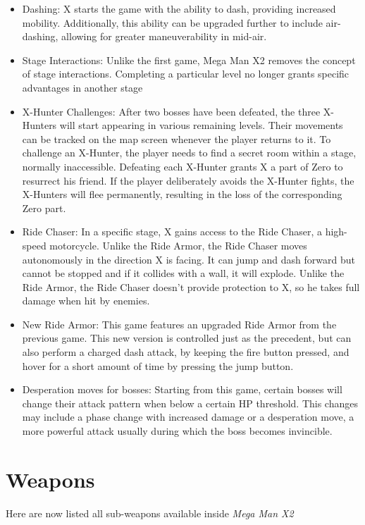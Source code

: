 \begin{itemize}
	\item Dashing: X starts the game with the ability to dash, providing increased mobility. Additionally, this ability can be upgraded further to include air-dashing, allowing for greater maneuverability in mid-air.
	\item Stage Interactions: Unlike the first game, Mega Man X2 removes the concept of stage interactions. Completing a particular level no longer grants specific advantages in another stage
	\item X-Hunter Challenges: After two bosses have been defeated, the three X-Hunters will start appearing in various remaining levels. Their movements can be tracked on the map screen whenever the player returns to it. To challenge an X-Hunter, the player needs to find a secret room within a stage, normally inaccessible. Defeating each X-Hunter grants X a part of Zero to resurrect his friend. If the player deliberately avoids the X-Hunter fights, the X-Hunters will flee permanently, resulting in the loss of the corresponding Zero part. 
	\item Ride Chaser: In a specific stage, X gains access to the Ride Chaser, a high-speed motorcycle. Unlike the Ride Armor, the Ride Chaser moves autonomously in the direction X is facing. It can jump and dash forward but cannot be stopped and if it collides with a wall, it will explode. Unlike the Ride Armor, the Ride Chaser doesn't provide protection to X, so he takes full damage when hit by enemies.
	\item New Ride Armor: This game features an upgraded Ride Armor from the previous game. This new version is controlled just as the precedent, but can also perform a charged dash attack, by keeping the fire button pressed, and hover for a short amount of time by pressing the jump button.
	\item Desperation moves for bosses: Starting from this game, certain bosses will change their attack pattern when below a certain HP threshold. This changes may include a phase change with increased damage or a desperation move, a more powerful attack usually during which the boss becomes invincible.
\end{itemize}

\section{Weapons}\label{X2:sub_weapon}
Here are now listed all sub-weapons available inside \textit{Mega Man X2}~\cite{wiki:X_weapons}

